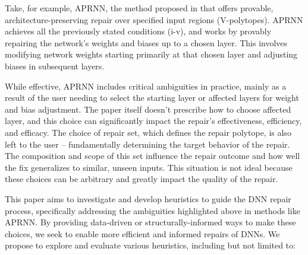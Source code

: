 \documentclass{article}
\begin{document}
Take, for example, APRNN, the method proposed in \cite{tao_architecture-preserving_2023} that offers provable, architecture-preserving repair over specified input regions (V-polytopes).
APRNN achieves all the previously stated conditions (i-v), and works by provably repairing the network's weights and biases up to a chosen layer.
This involves modifying network weights starting primarily at that chosen layer and adjusting biases in subsequent layers.

While effective, APRNN includes critical ambiguities in practice, mainly as a result of the user needing to select the starting layer or affected layers for weight and bias adjustment.
The paper itself doesn't prescribe how to choose affected layer, and this choice can significantly impact the repair's effectiveness, efficiency, and efficacy.
The choice of repair set, which defines the repair polytope, is also left to the user -- fundamentally determining the target behavior of the repair.
The composition and scope of this set influence the repair outcome and how well the fix generalizes to similar, unseen inputs.
This situation is not ideal because these choices can be arbitrary and greatly impact the quality of the repair.

This paper aims to investigate and develop heuristics to guide the DNN repair process, specifically addressing the ambiguities highlighted above in methods like APRNN.
By providing data-driven or structurally-informed ways to make these choices, we seek to enable more efficient and informed repairs of DNNs.
We propose to explore and evaluate various heuristics, including but not limited to:

\newpage
\end{document}

